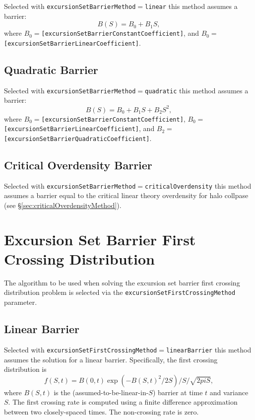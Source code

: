 Selected with {\tt excursionSetBarrierMethod}$=${\tt linear} this method assumes a barrier:
\begin{equation}
B(S) = B_0 + B_1 S,
\end{equation}
where $B_0=${\tt [excursionSetBarrierConstantCoefficient]}, and $B_0=${\tt [excursionSetBarrierLinearCoefficient]}.

\subsection{Quadratic Barrier}

Selected with {\tt excursionSetBarrierMethod}$=${\tt quadratic} this method assumes a barrier:
\begin{equation}
B(S) = B_0 + B_1 S + B_2 S^2,
\end{equation}
where $B_0=${\tt [excursionSetBarrierConstantCoefficient]},  $B_0=${\tt [excursionSetBarrierLinearCoefficient]}, and $B_2=${\tt [excursionSetBarrierQuadraticCoefficient]}.

\subsection{Critical Overdensity Barrier}

Selected with {\tt excursionSetBarrierMethod}$=${\tt criticalOverdensity} this method assumes a barrier equal to the critical linear theory overdensity for halo collpase (see \S\ref{sec:criticalOverdensityMethod}).

\section{Excursion Set Barrier First Crossing Distribution}

The algorithm to be used when solving the excursion set barrier first crossing distribution problem is selected via the {\tt excursionSetFirstCrossingMethod} parameter.

\subsection{Linear Barrier}

Selected with {\tt excursionSetFirstCrossingMethod}$=${\tt linearBarrier} this method assumes the solution for a linear barrier. Specifically, the first crossing distribution is
\begin{equation}
 f(S,t) = B(0,t) \exp(- B(S,t)^2/2S)/S/\sqrt{2 pi S},
\end{equation}
where $B(S,t)$ is the (assumed-to-be-linear-in-$S$) barrier at time $t$ and variance $S$. The first crossing rate is computed using a finite difference approximation between two closely-spaced times. The non-crossing rate is zero.

